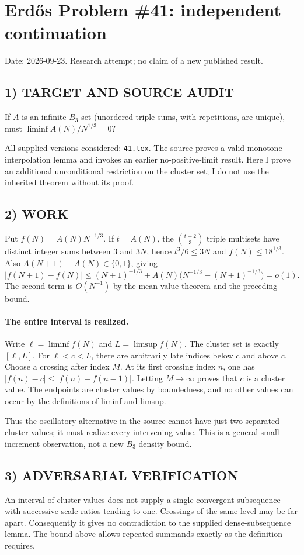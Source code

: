 \section{Erd\H{o}s Problem \#41: independent continuation}
\noindent Date: 2026-09-23. Research attempt; no claim of a new published result.
\subsection{1) TARGET AND SOURCE AUDIT}
If $A$ is an infinite $B_3$-set (unordered triple sums, with repetitions, are unique), must $\liminf A(N)/N^{1/3}=0$?

All supplied versions considered: \texttt{41.tex}.
The source proves a valid monotone interpolation lemma and invokes an earlier no-positive-limit result. Here I prove an additional unconditional restriction on the cluster set; I do not use the inherited theorem without its proof.
\subsection{2) WORK}
Put $f(N)=A(N)N^{-1/3}$. If $t=A(N)$, the $\binom{t+2}{3}$ triple multisets have distinct integer sums between $3$ and $3N$, hence $t^3/6\le3N$ and $f(N)\le18^{1/3}$. Also $A(N+1)-A(N)\in\{0,1\}$, giving
\[
|f(N+1)-f(N)|\le (N+1)^{-1/3}
+A(N)\bigl(N^{-1/3}-(N+1)^{-1/3}\bigr)=o(1).
\]
The second term is $O(N^{-1})$ by the mean value theorem and the preceding bound.

\paragraph{The entire interval is realized.}
Write $\ell=\liminf f(N)$ and $L=\limsup f(N)$. The cluster set is exactly $[\ell,L]$. For $\ell<c<L$, there are arbitrarily late indices below $c$ and above $c$. Choose a crossing after index $M$. At its first crossing index $n$, one has $|f(n)-c|\le |f(n)-f(n-1)|$. Letting $M\to\infty$ proves that $c$ is a cluster value. The endpoints are cluster values by boundedness, and no other values can occur by the definitions of liminf and limsup.

Thus the oscillatory alternative in the source cannot have just two separated cluster values; it must realize every intervening value. This is a general small-increment observation, not a new $B_3$ density bound.
\subsection{3) ADVERSARIAL VERIFICATION}
An interval of cluster values does not supply a single convergent subsequence with successive scale ratios tending to one. Crossings of the same level may be far apart. Consequently it gives no contradiction to the supplied dense-subsequence lemma. The bound above allows repeated summands exactly as the definition requires.
